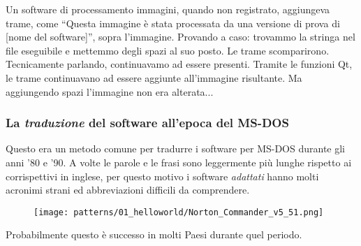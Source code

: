 Un software di processamento immagini, quando non registrato, aggiungeva trame,
come ``Questa immagine è stata processata da una versione di prova di [nome del software]'', sopra l'immagine.
Provando a caso: trovammo la stringa nel file eseguibile e mettemmo degli spazi al suo posto.
Le trame scomparirono.
Tecnicamente parlando, continuavamo ad essere presenti. 
Tramite le funzioni Qt, le trame continuavano ad essere aggiunte all'immagine risultante.
Ma aggiungendo spazi l'immagine non era alterata...

\subsubsection{La \emph{traduzione} del software all'epoca del MS-DOS}

Questo era un metodo comune per tradurre i software per MS-DOS durante gli anni '80 e '90.
A volte le parole e le frasi sono leggermente più lunghe rispetto ai corrispettivi in inglese, per questo motivo i software \emph{adattati}
hanno molti acronimi strani ed abbreviazioni difficili da comprendere.

\begin{figure}[H]
\centering
\texttt{[image: patterns/01\_helloworld/Norton\_Commander\_v5\_51.png]}
\caption{\ITph{}}
\end{figure}

Probabilmente questo è successo in molti Paesi durante quel periodo.
